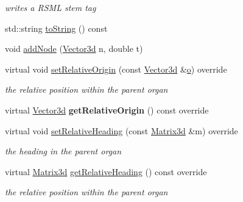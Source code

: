 \begin{DoxyCompactItemize}
\begin{DoxyCompactList}\small\item\em writes a R\+S\+ML stem tag \end{DoxyCompactList}\item 
std\+::string \hyperlink{classCPlantBox_1_1Stem_a08ed9dc10ef3ea13c90bc326e6cc989b}{to\+String} () const
\item 
void \hyperlink{classCPlantBox_1_1Stem_a81c72479211c41c67d534b7194054527}{add\+Node} (\hyperlink{classCPlantBox_1_1Vector3d}{Vector3d} n, double t)
\item 
\mbox{\label{classCPlantBox_1_1Stem_aecdf2dc122a63d5dc67ca20ba0632010}} 
virtual void \hyperlink{classCPlantBox_1_1Stem_aecdf2dc122a63d5dc67ca20ba0632010}{set\+Relative\+Origin} (const \hyperlink{classCPlantBox_1_1Vector3d}{Vector3d} \&\hyperlink{classCPlantBox_1_1Stem_abd1695ab6a0430f769f27bf78c60ef9d}{o}) override
\begin{DoxyCompactList}\small\item\em the relative position within the parent organ \end{DoxyCompactList}\item 
\mbox{\label{classCPlantBox_1_1Stem_a032e1631c65615400e444e695dffa3e6}} 
virtual \hyperlink{classCPlantBox_1_1Vector3d}{Vector3d} {\bfseries get\+Relative\+Origin} () const override
\item 
\mbox{\label{classCPlantBox_1_1Stem_a2f32a6b442d8a082cbadf326694904da}} 
virtual void \hyperlink{classCPlantBox_1_1Stem_a2f32a6b442d8a082cbadf326694904da}{set\+Relative\+Heading} (const \hyperlink{classCPlantBox_1_1Matrix3d}{Matrix3d} \&m) override
\begin{DoxyCompactList}\small\item\em the heading in the parent organ \end{DoxyCompactList}\item 
\mbox{\label{classCPlantBox_1_1Stem_a960ee01cd534157e493584c4862f1872}} 
virtual \hyperlink{classCPlantBox_1_1Matrix3d}{Matrix3d} \hyperlink{classCPlantBox_1_1Stem_a960ee01cd534157e493584c4862f1872}{get\+Relative\+Heading} () const override
\begin{DoxyCompactList}\small\item\em the relative position within the parent organ \end{DoxyCompactList}\item 

\end{DoxyCompactItemize}
